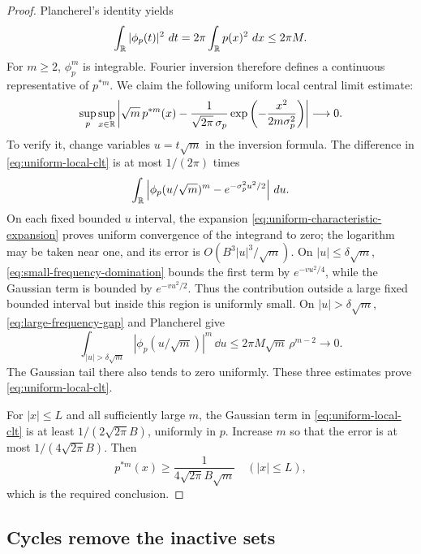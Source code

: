 \begin{proof}
Plancherel's identity yields
\[
 \int_\mathbb R|\phi_p(t)|^2\,\mathop{}\!d t
 =2\pi\int_\mathbb R p(x)^2\,\mathop{}\!d x\leq2\pi M.
\]
For $m\geq2$, $\phi_p^m$ is integrable.  Fourier inversion therefore
defines a continuous representative of $p^{*m}$.  We claim the following
uniform local central limit estimate:
\begin{equation}\label{eq:uniform-local-clt}
 \sup_p\sup_{x\in\mathbb R}
 \left|
 \sqrt m\,p^{*m}(x)
 -\frac1{\sqrt{2\pi}\,\sigma_p}
   \exp\left(-\frac{x^2}{2m\sigma_p^2}\right)
 \right|\longrightarrow0.
\end{equation}
To verify it, change variables $u=t\sqrt m$ in the inversion formula.
The difference in \eqref{eq:uniform-local-clt} is at most $1/(2\pi)$
times
\[
 \int_\mathbb R\left|
 \phi_p(u/\sqrt m)^m-e^{-\sigma_p^2u^2/2}
 \right|\,\mathop{}\!d u.
\]
On each fixed bounded $u$ interval, the expansion
\eqref{eq:uniform-characteristic-expansion} proves uniform convergence
of the integrand to zero; the logarithm may be taken near one, and its
error is $O(B^3|u|^3/\sqrt m)$.  On
$|u|\leq\delta\sqrt m$, \eqref{eq:small-frequency-domination} bounds
the first term by $e^{-vu^2/4}$, while the Gaussian term is bounded by
$e^{-vu^2/2}$.  Thus the contribution outside a large fixed bounded
interval but inside this region is uniformly small.  On
$|u|>\delta\sqrt m$, \eqref{eq:large-frequency-gap} and Plancherel give
\[
 \int_{|u|>\delta\sqrt m}|\phi_p(u/\sqrt m)|^m\,\dd u
 \leq2\pi M\sqrt m\,\rho^{m-2}\longrightarrow0.
\]
The Gaussian tail there also tends to zero uniformly.  These three
estimates prove \eqref{eq:uniform-local-clt}.

For $|x|\leq L$ and all sufficiently large $m$, the Gaussian term in
\eqref{eq:uniform-local-clt} is at least
$1/(2\sqrt{2\pi}B)$, uniformly in $p$.  Increase $m$ so that the
error is at most $1/(4\sqrt{2\pi}B)$.  Then
\[
 p^{*m}(x)\geq\frac1{4\sqrt{2\pi}B\sqrt m}
 \quad(|x|\leq L),
\]
which is the required conclusion.
\end{proof}

\subsection{Cycles remove the inactive sets}

